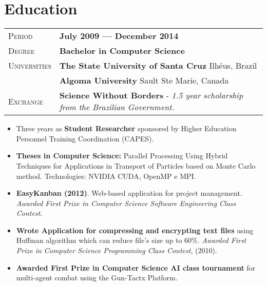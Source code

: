 \documentclass[10pt, a4paper, oneside, final]{scrartcl} %
\newcommand{\gray}{\rowcolor[gray]{.90}} %
\begin{document}


\section{Education}

\begin{center}
\begin{tabularx}{1.0\linewidth}{>{\raggedleft\scshape}p{2.34cm}X}
\gray Period & \textbf{July 2009 --- December 2014}\\
\gray Degree & \textbf{Bachelor in Computer Science}\\
\gray Universities & \textbf{The State University of Santa Cruz} \hfill Ilhéus, Brazil\\ 
\gray & \textbf{Algoma University} \hfill Sault Ste Marie, Canada\\
\gray Exchange & \textbf{Science Without Borders} - \textit{1.5 year scholarship from the Brazilian Government.}
\end{tabularx}
\end{center}

\begin{itemize}\itemsep1.5pt

\item Three years as \textbf{Student Researcher} sponsored by Higher Education Personnel Training Coordination (CAPES).

\item \textbf{Theses in Computer Science:} Parallel Processing Using Hybrid Techniques for Applications in Transport of Particles based on Monte Carlo method. Technologies: NVIDIA CUDA, OpenMP e MPI.
   
\item \textbf{EasyKanban (2012)}. Web-based application for project management. \textit{Awarded First Prize in Computer Science Software Engineering Class Contest}.
  
\item \textbf{Wrote Application for compressing and encrypting text files} using Huffman algorithm which can reduce file's size up to 60\%. \textit{Awarded First Prize in Computer Science Programming Class Contest}, (2010). 


\item \textbf{Awarded First Prize in Computer Science AI class tournament} for multi-agent combat using the Gun-Tactx Platform.
  
\end{itemize}
\end{document}
